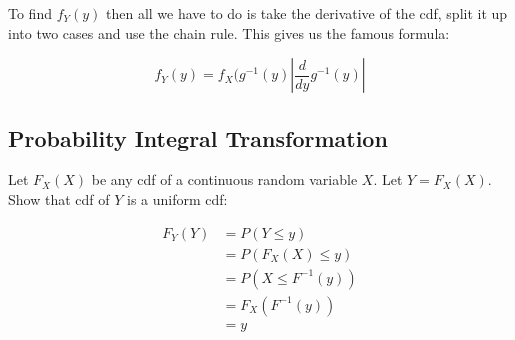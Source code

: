 To find $f_Y(y)$ then all we have to do is take the derivative of the cdf, split it up into two cases and use the chain rule. This gives us the famous formula:

\begin{equation}
f_Y(y) = f_X(g^{-1}(y) |\frac{d}{dy} g^{-1}(y)| 
\end{equation}


\subsection{Probability Integral Transformation}

Let $F_X(X)$ be any cdf of a continuous random variable $X$. Let $Y=F_X(X)$. Show that cdf of $Y$ is a uniform cdf:

\begin{equation}
\begin{split}
F_Y(Y) &= P(Y \leq y) \\ 
& = P(F_X(X) \leq y) \\
&= P(X \leq F^{-1}(y)) \\
&= F_X(F^{-1}(y)) \\
&= y
\end{split}
\end{equation}





